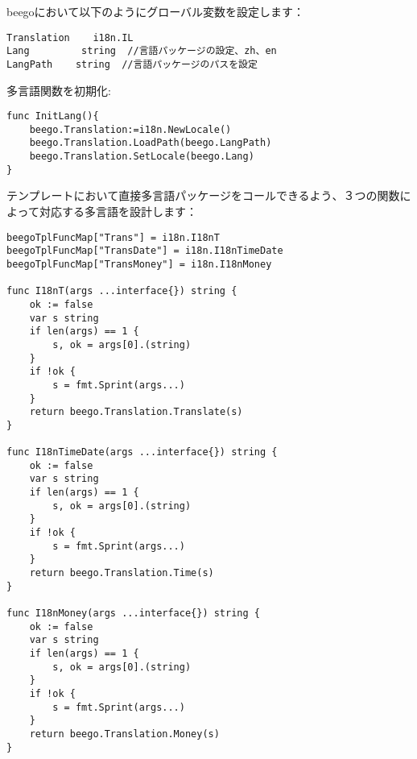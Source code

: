 beegoにおいて以下のようにグローバル変数を設定します：


\begin{lstlisting}[numbers=none]
Translation    i18n.IL  
Lang         string  //言語パッケージの設定、zh、en
LangPath    string  //言語パッケージのパスを設定
\end{lstlisting}

多言語関数を初期化:

\begin{lstlisting}[numbers=none]
func InitLang(){
    beego.Translation:=i18n.NewLocale()
    beego.Translation.LoadPath(beego.LangPath)
    beego.Translation.SetLocale(beego.Lang)
}
\end{lstlisting}

テンプレートにおいて直接多言語パッケージをコールできるよう、３つの関数によって対応する多言語を設計します：

\begin{lstlisting}[numbers=none]
beegoTplFuncMap["Trans"] = i18n.I18nT
beegoTplFuncMap["TransDate"] = i18n.I18nTimeDate
beegoTplFuncMap["TransMoney"] = i18n.I18nMoney

func I18nT(args ...interface{}) string {
    ok := false
    var s string
    if len(args) == 1 {
        s, ok = args[0].(string)
    }
    if !ok {
        s = fmt.Sprint(args...)
    }
    return beego.Translation.Translate(s)
}

func I18nTimeDate(args ...interface{}) string {
    ok := false
    var s string
    if len(args) == 1 {
        s, ok = args[0].(string)
    }
    if !ok {
        s = fmt.Sprint(args...)
    }
    return beego.Translation.Time(s)
}

func I18nMoney(args ...interface{}) string {
    ok := false
    var s string
    if len(args) == 1 {
        s, ok = args[0].(string)
    }
    if !ok {
        s = fmt.Sprint(args...)
    }
    return beego.Translation.Money(s)
}
\end{lstlisting}




